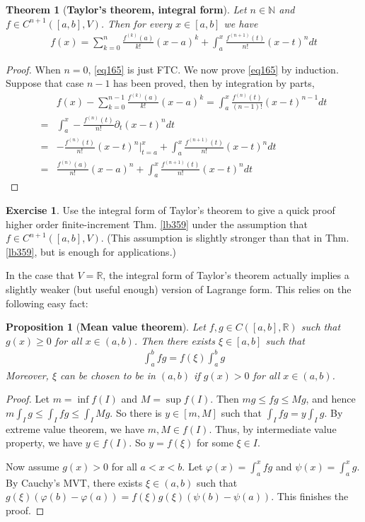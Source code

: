 \documentclass[12pt,b5paper,notitlepage]{article}
\theoremstyle{definition}
\newtheorem{exe}[df]{Exercise}
\theoremstyle{plain}
\newtheorem{thm}[df]{Theorem}
\newtheorem{pp}[df]{Proposition}
\newcommand{\Nbb}{\mathbb N}
\newcommand{\Rbb}{\mathbb R}
\numberwithin{equation}{section}
\begin{document}
\begin{thm}[\textbf{Taylor's theorem, integral form}]   \label{lb425}
Let $n\in\Nbb$ and $f\in C^{n+1}([a,b],V)$. Then for every $x\in[a,b]$ we have
\begin{align}\label{eq165}
f(x)=\sum_{k=0}^n\frac{f^{(k)}(a)}{k!}(x-a)^k+\int_a^x\frac{f^{(n+1)}(t)}{n!}(x-t)^ndt
\end{align}
\end{thm}

\begin{proof}
When $n=0$, \eqref{eq165} is just FTC. We now prove \eqref{eq165} by induction. Suppose that case $n-1$ has been proved, then by integration by parts,
\begin{align*}
&f(x)-\sum_{k=0}^{n-1}\frac{f^{(k)}(a)}{k!}(x-a)^k=\int_a^x\frac{f^{(n)}(t)}{(n-1)!}(x-t)^{n-1}dt\\
=&\int_a^x -\frac{f^{(n)}(t)}{n!}\partial_t(x-t)^ndt\\
=&-\frac{f^{(n)}(t)}{n!}(x-t)^n\Big|_{t=a}^x+\int_a^x\frac{f^{(n+1)}(t)}{n!}(x-t)^ndt\\
=&\frac {f^{(n)}(a)}{n!}(x-a)^n+\int_a^x\frac{f^{(n+1)}(t)}{n!}(x-t)^ndt
\end{align*}
\end{proof}


\begin{exe}
Use the integral form of Taylor's theorem to give a quick proof higher order finite-increment Thm. \ref{lb359} under the assumption that $f\in C^{n+1}([a,b],V)$. (This assumption is slightly stronger than that in Thm. \ref{lb359}, but is enough for applications.)
\end{exe}




In the case that $V=\Rbb$, the integral form of Taylor's theorem actually implies a slightly weaker (but useful enough) version of Lagrange form. This relies on the following easy fact:


\begin{pp}[\textbf{Mean value theorem}]
Let $f,g\in C([a,b],\Rbb)$ such that $g(x)\geq 0$ for all $x\in(a,b)$. Then there exists $\xi\in [a,b]$ such that
\begin{align}
\int_a^bfg=f(\xi)\int_a^bg
\end{align}
Moreover, $\xi$ can be chosen to be in $(a,b)$ if $g(x)>0$ for all $x\in(a,b)$.
\end{pp}

\begin{proof}
Let $m=\inf f(I)$ and $M=\sup f(I)$. Then $mg\leq fg\leq Mg$, and hence $m\int_Ig\leq \int_Ifg\leq \int_IMg$. So there is $y\in [m,M]$ such that $\int_Ifg=y\int_Ig$. By extreme value theorem, we have $m,M\in f(I)$. Thus, by intermediate value property, we have $y\in f(I)$. So $y=f(\xi)$ for some $\xi\in I$.

Now assume $g(x)>0$ for all $a<x<b$. Let $\varphi(x)=\int_a^xfg$ and $\psi(x)=\int_a^xg$. By Cauchy's MVT, there exists $\xi\in(a,b)$ such that $g(\xi)(\varphi(b)-\varphi(a))=f(\xi)g(\xi)(\psi(b)-\psi(a))$. This finishes the proof.
\end{proof}
\end{document}

